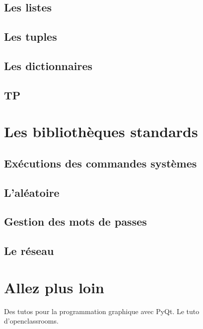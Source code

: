 \documentclass[12pt]{article}
\begin{document}
    \subsection{Les listes}
    \subsection{Les tuples}
    \subsection{Les dictionnaires}
    \subsection{TP}

\section{Les bibliothèques standards}
    \subsection{Exécutions des commandes systèmes}
    \subsection{L'aléatoire}
    \subsection{Gestion des mots de passes}
    \subsection{Le réseau}

\section{Allez plus loin}
    Des tutos pour la programmation graphique avec PyQt. Le tuto d'openclassrooms.
\end{document}
